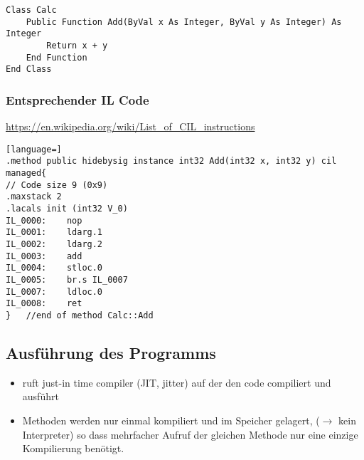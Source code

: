 \begin{lstlisting}[language={[Visual]Basic}]
Class Calc
	Public Function Add(ByVal x As Integer, ByVal y As Integer) As Integer
		Return x + y
	End Function
End Class
\end{lstlisting}


\subsubsection{Entsprechender IL Code}

\url{https://en.wikipedia.org/wiki/List_of_CIL_instructions}

\begin{lstlisting}[language=]
.method public hidebysig instance int32 Add(int32 x, int32 y) cil managed{
// Code size 9 (0x9)
.maxstack 2
.lacals init (int32 V_0)
IL_0000:	nop
IL_0001:	ldarg.1
IL_0002:	ldarg.2
IL_0003:	add
IL_0004:	stloc.0
IL_0005:	br.s IL_0007
IL_0007:	ldloc.0
IL_0008:	ret
}	//end of method Calc::Add
\end{lstlisting}


\subsection{Ausführung des Programms}

\begin{itemize}
\item ruft just-in time compiler (JIT, jitter) auf der den code compiliert und ausführt
\item Methoden werden nur einmal kompiliert und im Speicher gelagert, ($\to$ kein Interpreter) so dass mehrfacher Aufruf der gleichen Methode nur eine einzige Kompilierung benötigt. 
\end{itemize}
~

